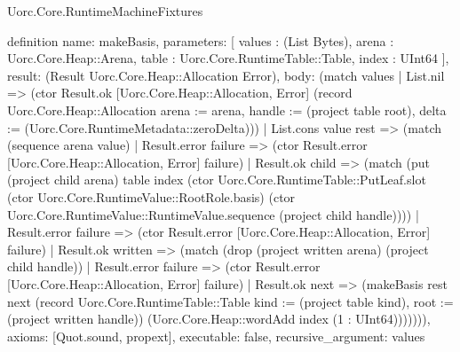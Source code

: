 \begin{lexlean}{Uorc.Core.RuntimeMachineFixtures}
\begin{semanticmodule}
definition{
  name: makeBasis,
  parameters: [
    values : (List Bytes),
    arena : Uorc.Core.Heap::Arena,
    table : Uorc.Core.RuntimeTable::Table,
    index : UInt64
  ],
  result: (Result Uorc.Core.Heap::Allocation Error),
  body: (match values
    | List.nil => (ctor Result.ok [Uorc.Core.Heap::Allocation, Error] (record Uorc.Core.Heap::Allocation {arena := arena, handle := (project table root), delta := (Uorc.Core.RuntimeMetadata::zeroDelta)}))
    | List.cons value rest => (match (sequence arena value)
      | Result.error failure => (ctor Result.error [Uorc.Core.Heap::Allocation, Error] failure)
      | Result.ok child => (match (put (project child arena) table index (ctor Uorc.Core.RuntimeTable::PutLeaf.slot (ctor Uorc.Core.RuntimeValue::RootRole.basis) (ctor Uorc.Core.RuntimeValue::RuntimeValue.sequence (project child handle))))
        | Result.error failure => (ctor Result.error [Uorc.Core.Heap::Allocation, Error] failure)
        | Result.ok written => (match (drop (project written arena) (project child handle))
          | Result.error failure => (ctor Result.error [Uorc.Core.Heap::Allocation, Error] failure)
          | Result.ok next => (makeBasis rest next (record Uorc.Core.RuntimeTable::Table {kind := (project table kind), root := (project written handle)}) (Uorc.Core.Heap::wordAdd index (1 : UInt64))))))),
  axioms: [Quot.sound, propext],
  executable: false,
  recursive_argument: values
}


\end{semanticmodule}
\end{lexlean}
